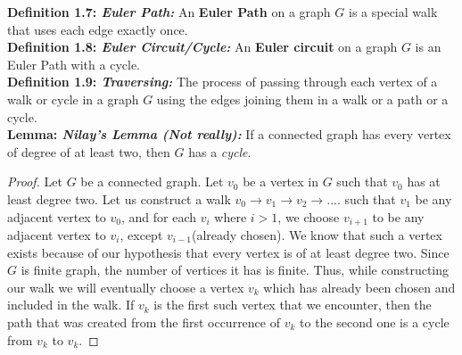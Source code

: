 \documentclass[17pt]{article}
\begin{document}
\textbf{Definition 1.7: \textit{Euler Path: }}An \textbf{Euler Path} on a graph $G$ is a special walk that uses each edge exactly once.\\

\textbf{Definition 1.8: \textit{Euler Circuit/Cycle: }}An \textbf{Euler circuit} on a graph $G$ is an Euler Path with a cycle.\\

\textbf{Definition 1.9: \textit{Traversing: }}The process of passing through each vertex of a  walk or cycle in a graph $G$ using the edges joining them in a walk or a path or a cycle.\\

\textbf{Lemma: \textit{Nilay's Lemma (Not really):}} If a connected graph has every vertex of degree of at least two, then $G$ has a \textit{cycle}.
\begin{proof}
Let $G$ be a connected graph. Let $v_0$ be a vertex in $G$ such that $v_0$ has at least degree two. Let us construct a walk $v_0 \rightarrow v_1 \rightarrow v_2 \rightarrow ....$ such that $v_1$ be any adjacent vertex to $v_0$, and for each $v_i$ where $i > 1$, we choose $v_{i+1}$ to be any adjacent vertex to $v_i$, except $v_{i-1}$(already chosen). We know that such a vertex exists because of our hypothesis that every vertex is of at least degree two. Since $G$ is finite graph, the number of vertices it has is finite. Thus, while constructing our walk we will eventually choose a vertex $v_k$ which has already been chosen and included in the walk. If $v_k$ is the first such vertex that we encounter, then the path that was created from the first occurrence of $v_k$ to the second one is a cycle from $v_k$ to $v_k$.
\end{proof}



\end{document}
